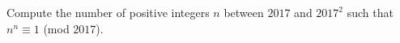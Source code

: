 \begin{problem}
    Compute the number of positive integers $n$ between $2017$ and $2017^2$ such that $n^n \equiv 1$ (mod $2017$). 

    \label{16PUMACNA7}

\end{problem}